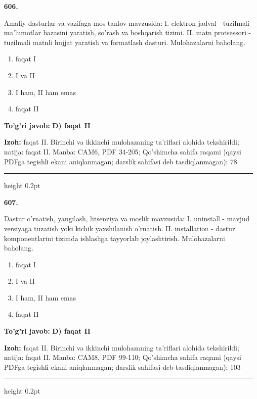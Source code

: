 \documentclass[10pt,a4paper]{article}
\begin{document}
{\bfseries\sffamily\color{ink} 606.}
\par
Amaliy dasturlar va vazifaga mos tanlov mavzusida: I. elektron jadval - tuzilmali ma'lumotlar bazasini yaratish, so'rash va boshqarish tizimi. II. matn protsessori - tuzilmali matnli hujjat yaratish va formatlash dasturi. Mulohazalarni baholang.
\begin{enumerate}[label=\Alph*),leftmargin=9mm]
\item faqat I
\item I va II
\item I ham, II ham emas
\item faqat II
\end{enumerate}
\begin{tcolorbox}[enhanced,breakable,colback=teal!4,colframe=teal!60!black,boxrule=0.45pt,arc=1.2mm,left=2.7mm,right=2.7mm,top=1.8mm,bottom=1.8mm,before skip=2mm,after skip=2mm]
{\bfseries\sffamily\color{teal}To'g'ri javob:} \textbf{D) faqat II}
\par\smallskip
{\bfseries Izoh:} faqat II. Birinchi va ikkinchi mulohazaning ta'riflari alohida tekshirildi; natija: faqat II. Manba: CAM6, PDF 34-205; Qo'shimcha sahifa raqami (qaysi PDFga tegishli ekani aniqlanmagan; darslik sahifasi deb tasdiqlanmagan): 78
\end{tcolorbox}
\vspace{2mm}\hrule height 0.2pt\vspace{3mm}

{\bfseries\sffamily\color{ink} 607.}
\par
Dastur o'rnatish, yangilash, litsenziya va moslik mavzusida: I. uninstall - mavjud versiyaga tuzatish yoki kichik yaxshilanish o'rnatish. II. installation - dastur komponentlarini tizimda ishlashga tayyorlab joylashtirish. Mulohazalarni baholang.
\begin{enumerate}[label=\Alph*),leftmargin=9mm]
\item faqat I
\item I va II
\item I ham, II ham emas
\item faqat II
\end{enumerate}
\begin{tcolorbox}[enhanced,breakable,colback=teal!4,colframe=teal!60!black,boxrule=0.45pt,arc=1.2mm,left=2.7mm,right=2.7mm,top=1.8mm,bottom=1.8mm,before skip=2mm,after skip=2mm]
{\bfseries\sffamily\color{teal}To'g'ri javob:} \textbf{D) faqat II}
\par\smallskip
{\bfseries Izoh:} faqat II. Birinchi va ikkinchi mulohazaning ta'riflari alohida tekshirildi; natija: faqat II. Manba: CAM8, PDF 99-110; Qo'shimcha sahifa raqami (qaysi PDFga tegishli ekani aniqlanmagan; darslik sahifasi deb tasdiqlanmagan): 103
\end{tcolorbox}
\vspace{2mm}\hrule height 0.2pt\vspace{3mm}
\end{document}
